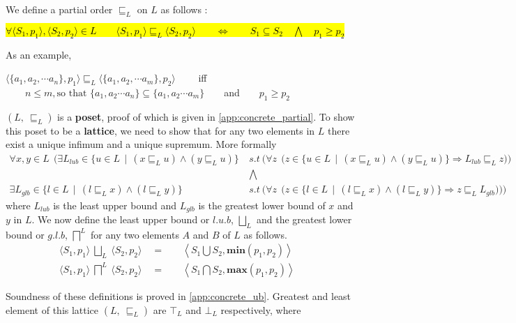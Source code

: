 \documentclass[final,3p, review, times]{util/elsarticle}
\begin{document}
We define a partial order $\sqsubseteq_L$ on $L$ as follows :

\centerline{\hl{$\forall \langle S_1,p_1\rangle, \langle S_2,p_2\rangle\in L\qquad \langle S_1,p_1\rangle\sqsubseteq_L \langle S_2,p_2\rangle\qquad\iff \qquad S_1\subseteq S_2\quad\bigwedge\quad p_1\geq p_2$}}

As an example,\\
\centerline{
  $\langle\{a_1, a_2,\cdots a_n\},p_1\rangle\sqsubseteq_L\langle\{a_1, a_2,\cdots a_m\},p_2\rangle\qquad$ iff $\qquad n\leq m, \text{so that\ }\{a_1,a_2\cdots a_n\}\subseteq\{a_1,a_2\cdots a_m\}\qquad$and$\qquad p_1\geq p_2$
}

$(L,\ \sqsubseteq_L)$ is a \textbf{poset}, proof of which is given in \ref{app:concrete_partial}. To show this poset to be a \textbf{lattice}, we need to show that for any two elements in $L$ there exist a unique infimum and a unique supremum. More formally
\begin{align*}
  \forall x,y\in L\ \ \Bigg(\exists L_{lub}\in\Big\{u\in L\ \ \big|\ \ (x\sqsubseteq_L u)\land(y\sqsubseteq_L u)\Big\}\ &s.t\ \bigg(\forall z\ \ \Big(z\in\Big\{u\in L\ \ \big|\ \ (x\sqsubseteq_L u)\land(y\sqsubseteq_L u)\Big\} \Rightarrow L_{lub}\sqsubseteq_L z\Big)\bigg)\\
  &\bigwedge\\
  \exists L_{glb}\in\Big\{l\in L\ \ \big|\ \ (l\sqsubseteq_L x)\land(l\sqsubseteq_L y)\Big\}\ &s.t\ \bigg(\forall z\ \ \Big(z\in\Big\{l\in L\ \ \big|\ \ (l\sqsubseteq_L x)\land(l\sqsubseteq_L y)\Big\} \Rightarrow z\sqsubseteq_L L_{glb}\Big)\bigg)\Bigg)
\end{align*}
where $L_{lub}$ is the least upper bound and $L_{glb}$ is the greatest lower bound of $x$ and $y$ in $L$. We now define the least upper bound or $l.u.b$, $\displaystyle\bigsqcup_L$ and the greatest lower bound or $g.l.b$, $\displaystyle\bigsqcap^L$ for any two elements $A$ and $B$ of $L$ as follows.
\begin{align}
    \langle S_1,p_1\rangle\ \bigsqcup_L\ \langle S_2,p_2\rangle\quad=\quad&\left\langle S_1\bigcup S_2, \textbf{min}(p_1,p_2)\right\rangle&\label{eq:lub_L}\\
    \langle S_1,p_1\rangle\ \bigsqcap^L\ \langle S_2,p_2\rangle\quad=\quad&\left\langle S_1\bigcap S_2, \textbf{max}(p_1,p_2)\right\rangle&\label{eq:glb_L}
\end{align}

Soundness of these definitions is proved in \ref{app:concrete_ub}. Greatest and least element of this lattice $(L,\ \sqsubseteq_L)$ are $\top_L$ and $\bot_L$ respectively, where
\end{document}
